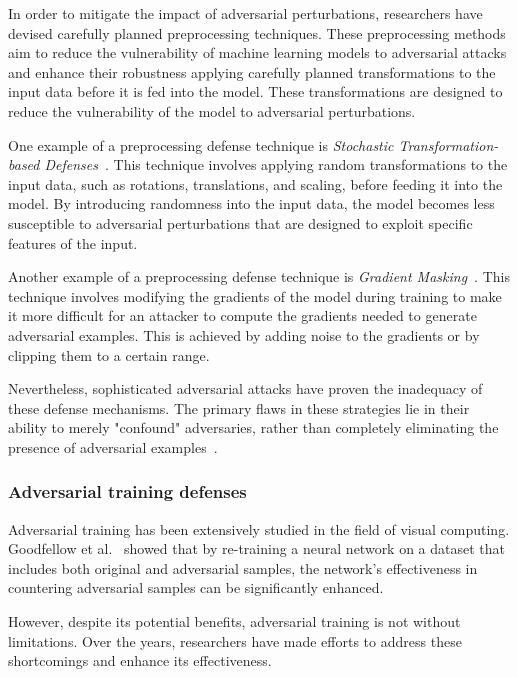 In order to mitigate the impact of adversarial perturbations, researchers have devised carefully planned preprocessing
techniques.
These preprocessing methods aim to reduce the vulnerability of machine learning models to adversarial attacks and
enhance their robustness applying carefully planned transformations to the input data before it is fed into the model.
These transformations are designed to reduce the vulnerability of the model to adversarial perturbations.

One example of a preprocessing defense technique is \textit{Stochastic Transformation-based Defenses}~\cite{kou2019enhancing}.
This technique involves applying random transformations to the input data, such as rotations, translations, and scaling,
before feeding it into the model.
By introducing randomness into the input data, the model becomes less susceptible to adversarial perturbations that are
designed to exploit specific features of the input.

Another example of a preprocessing defense technique is \textit{Gradient Masking}~\cite{athalye2018obfuscated}.
This technique involves modifying the gradients of the model during training to make it more difficult for an attacker to
compute the gradients needed to generate adversarial examples.
This is achieved by adding noise to the gradients or by clipping them to a certain range.

Nevertheless, sophisticated adversarial attacks have proven the inadequacy of these defense mechanisms.
The primary flaws in these strategies lie in their ability to merely "confound" adversaries, rather than completely
eliminating the presence of adversarial examples~\cite{xu2020adversarial}.

\subsubsection{Adversarial training defenses}\label{subsubsec:adversarial-training-defenses}

Adversarial training has been extensively studied in the field of visual computing.
Goodfellow et al.~\cite{goodfellow2014explaining} showed that by re-training a neural network on a dataset that includes
both original and adversarial samples, the network's effectiveness in countering adversarial samples can be
significantly enhanced.

However, despite its potential benefits, adversarial training is not without limitations.
Over the years, researchers have made efforts to address these shortcomings and enhance its effectiveness.

